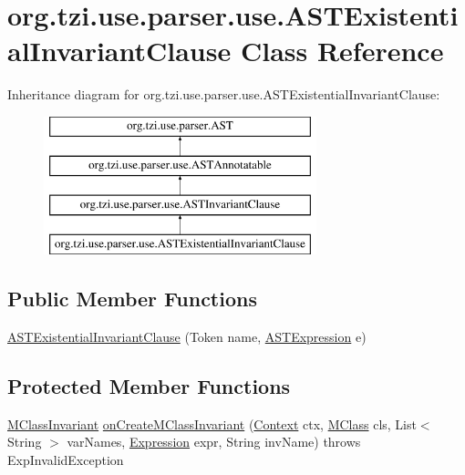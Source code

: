 \hypertarget{classorg_1_1tzi_1_1use_1_1parser_1_1use_1_1_a_s_t_existential_invariant_clause}{\section{org.\-tzi.\-use.\-parser.\-use.\-A\-S\-T\-Existential\-Invariant\-Clause Class Reference}
\label{classorg_1_1tzi_1_1use_1_1parser_1_1use_1_1_a_s_t_existential_invariant_clause}
}
Inheritance diagram for org.\-tzi.\-use.\-parser.\-use.\-A\-S\-T\-Existential\-Invariant\-Clause\-:\begin{figure}[H]
\begin{center}
\leavevmode
\includegraphics[height=4.000000cm]{classorg_1_1tzi_1_1use_1_1parser_1_1use_1_1_a_s_t_existential_invariant_clause}
\end{center}
\end{figure}
\subsection*{Public Member Functions}
\begin{DoxyCompactItemize}
\item 
\hyperlink{classorg_1_1tzi_1_1use_1_1parser_1_1use_1_1_a_s_t_existential_invariant_clause_a214d4948204593fc90520b37b0e59dab}{A\-S\-T\-Existential\-Invariant\-Clause} (Token name, \hyperlink{classorg_1_1tzi_1_1use_1_1parser_1_1ocl_1_1_a_s_t_expression}{A\-S\-T\-Expression} e)
\end{DoxyCompactItemize}
\subsection*{Protected Member Functions}
\begin{DoxyCompactItemize}
\item 
\hyperlink{classorg_1_1tzi_1_1use_1_1uml_1_1mm_1_1_m_class_invariant}{M\-Class\-Invariant} \hyperlink{classorg_1_1tzi_1_1use_1_1parser_1_1use_1_1_a_s_t_existential_invariant_clause_a1570db177b2e84b818be795c30c54aa7}{on\-Create\-M\-Class\-Invariant} (\hyperlink{classorg_1_1tzi_1_1use_1_1parser_1_1_context}{Context} ctx, \hyperlink{interfaceorg_1_1tzi_1_1use_1_1uml_1_1mm_1_1_m_class}{M\-Class} cls, List$<$ String $>$ var\-Names, \hyperlink{classorg_1_1tzi_1_1use_1_1uml_1_1ocl_1_1expr_1_1_expression}{Expression} expr, String inv\-Name)  throws Exp\-Invalid\-Exception 
\end{DoxyCompactItemize}



